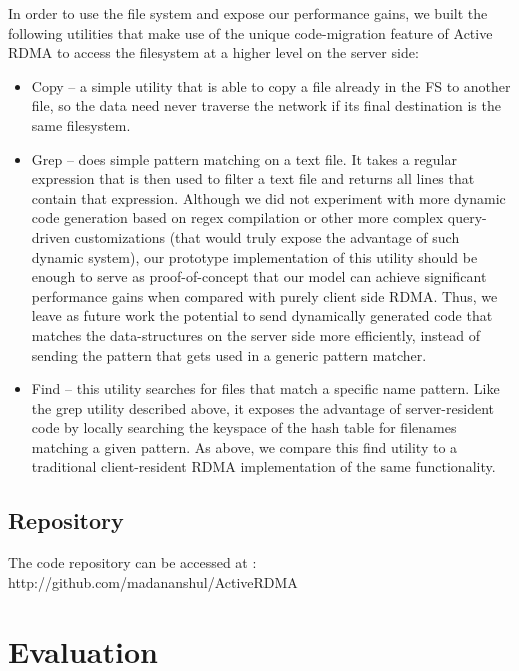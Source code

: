 \documentclass[10pt]{article}
\begin{document}
In order to use the file system and expose our performance gains, we
built the following utilities that make use of the unique
code-migration feature of Active RDMA to access the filesystem at a
higher level on the server side:

\begin{itemize}
\item Copy -- a simple utility that is able to copy a file already in
  the FS to another file, so the data need never traverse the network
  if its final destination is the same filesystem.

\item Grep -- does simple pattern matching on a text file. It takes a
  regular expression that is then used to filter a text file and
  returns all lines that contain that expression. Although we did not
  experiment with more dynamic code generation based on regex
  compilation or other more complex query-driven customizations (that
  would truly expose the advantage of such dynamic system), our
  prototype implementation of this utility should be enough to serve
  as proof-of-concept that our model can achieve significant
  performance gains when compared with purely client side RDMA. Thus,
  we leave as future work the potential to send dynamically generated
  code that matches the data-structures on the server side more
  efficiently, instead of sending the pattern that gets used in a
  generic pattern matcher.

\item Find -- this utility searches for files that match a specific
  name pattern. Like the grep utility described above, it exposes the
  advantage of server-resident code by locally searching the keyspace
  of the hash table for filenames matching a given pattern. As above,
  we compare this find utility to a traditional client-resident RDMA
  implementation of the same functionality.

\end{itemize}

\subsection{Repository}
The code repository can be accessed at : http://github.com/madananshul/ActiveRDMA


\section{Evaluation}
\end{document}
